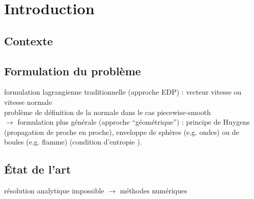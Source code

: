 \def\chapterabstract{}
\chapter*{Introduction}

\section*{Contexte}%


\section*{Formulation du problème}%
formulation lagrangienne traditionnelle (approche EDP) : vecteur vitesse 
ou vitesse normale 
\\
problème de définition de la normale dans le cas piecewise-smooth\\
$\to$ formulation plus générale (approche ``géométrique'') : principe de Huygens (propagation de proche en proche), enveloppe de sphères (e.g. ondes) ou de boules (e.g. flamme) (condition d'entropie \cite{sethian1999}).

\section*{État de l'art}
résolution analytique impossible $\to$ méthodes numériques\\
